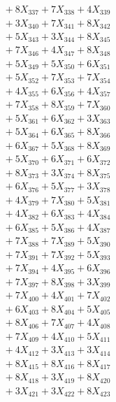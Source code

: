 \documentclass[a4paper,10pt]{article}
\begin{document}
{\begin{align}
&\;  + 8 X_{337} + 7 X_{338} + 4 X_{339} \\[0.5ex]\allowbreak
&\;  + 3 X_{340} + 7 X_{341} + 8 X_{342} \\[0.3ex]
&\;  + 5 X_{343} + 3 X_{344} + 8 X_{345} \\[0.3ex]
&\;  + 7 X_{346} + 4 X_{347} + 8 X_{348} \\[0.3ex]
&\;  + 5 X_{349} + 5 X_{350} + 6 X_{351} \\[0.3ex]
&\;  + 5 X_{352} + 7 X_{353} + 7 X_{354} \\[0.3ex]
&\;  + 4 X_{355} + 6 X_{356} + 4 X_{357} \\[0.3ex]
&\;  + 7 X_{358} + 8 X_{359} + 7 X_{360} \\[0.3ex]
&\;  + 5 X_{361} + 6 X_{362} + 3 X_{363} \\[0.3ex]
&\;  + 5 X_{364} + 6 X_{365} + 8 X_{366} \\[0.3ex]
&\;  + 6 X_{367} + 5 X_{368} + 8 X_{369} \\[0.5ex]\allowbreak
&\;  + 5 X_{370} + 6 X_{371} + 6 X_{372} \\[0.3ex]
&\;  + 8 X_{373} + 3 X_{374} + 8 X_{375} \\[0.3ex]
&\;  + 6 X_{376} + 5 X_{377} + 3 X_{378} \\[0.3ex]
&\;  + 4 X_{379} + 7 X_{380} + 5 X_{381} \\[0.3ex]
&\;  + 4 X_{382} + 6 X_{383} + 4 X_{384} \\[0.3ex]
&\;  + 6 X_{385} + 5 X_{386} + 4 X_{387} \\[0.3ex]
&\;  + 7 X_{388} + 7 X_{389} + 5 X_{390} \\[0.3ex]
&\;  + 7 X_{391} + 7 X_{392} + 5 X_{393} \\[0.3ex]
&\;  + 7 X_{394} + 4 X_{395} + 6 X_{396} \\[0.3ex]
&\;  + 7 X_{397} + 8 X_{398} + 3 X_{399} \\[0.5ex]\allowbreak
&\;  + 7 X_{400} + 4 X_{401} + 7 X_{402} \\[0.3ex]
&\;  + 6 X_{403} + 8 X_{404} + 5 X_{405} \\[0.3ex]
&\;  + 8 X_{406} + 7 X_{407} + 4 X_{408} \\[0.3ex]
&\;  + 7 X_{409} + 4 X_{410} + 5 X_{411} \\[0.3ex]
&\;  + 4 X_{412} + 3 X_{413} + 3 X_{414} \\[0.3ex]
&\;  + 8 X_{415} + 8 X_{416} + 8 X_{417} \\[0.3ex]
&\;  + 8 X_{418} + 3 X_{419} + 8 X_{420} \\[0.3ex]
&\;  + 3 X_{421} + 3 X_{422} + 8 X_{423} \\[0.3ex]

\end{align}}
\end{document}
